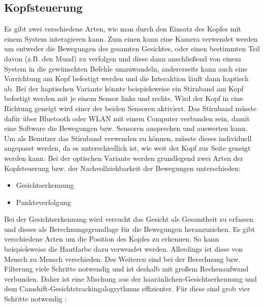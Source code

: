 \subsection{Kopfsteuerung}

Es gibt zwei verschiedene Arten, wie man durch den Einsatz des Kopfes mit einem System interagieren kann. Zum einen kann eine Kamera verwendet werden um entweder die Bewegungen des gesamten Gesichtes, oder einen bestimmten Teil davon (z.B. den Mund) zu verfolgen und diese dann anschließend von einem System in die gewünschten Befehle umzuwandeln, andererseits kann auch eine Vorrichtung am Kopf befestigt werden und die Interaktion läuft dann haptisch ab.
\newline \newline
Bei der haptischen Variante könnte beispielsweise ein Stirnband am Kopf befestigt werden mit je einem Sensor links und rechts. Wird der Kopf in eine Richtung geneigt wird einer der beiden Sensoren aktiviert. Das Stirnband müsste dafür über Bluetooth oder WLAN mit einem Computer verbunden sein, damit eine Software die Bewegungen bzw. Sensoren ansprechen und auswerten kann. Um als Benutzer das Stirnband verwenden zu können, müsste dieses individuell angepasst werden, da es unterschiedlich ist, wie weit der Kopf zur Seite geneigt werden kann. 
\newline \newline
Bei der optischen Variante werden grundlegend zwei Arten der Kopfsteuerung bzw. der Nachvollziehbarkeit der Bewegungen unterschieden:
\begin{itemize}
      \item Gesichtserkennung
      \item Punkteverfolgung
\end{itemize}
\vspace{\baselineskip}
Bei der Gesichtserkennung wird versucht das Gesicht als Gesamtheit zu erfassen und dieses als Berechnungsgrundlage für die Bewegungen heranzuziehen. Es gibt verschiedene Arten um die Position des Kopfes zu erkennen. So kann beispielsweise die Hautfarbe dazu verwendet werden. Allerdings ist diese von Mensch zu Mensch verschieden. Des Weiteren sind bei der Berechnung bzw. Filterung viele Schritte notwendig und ist deshalb mit großem Rechenaufwand verbunden. Daher ist eine Mischung aus der haaränlichen-Gesichtserkennung und dem Camshift-Gesichtstrackingalogrythmus effizienter.
\newline \newline
Für diese sind grob vier Schritte notwendig \cite{FaceTracking}:
